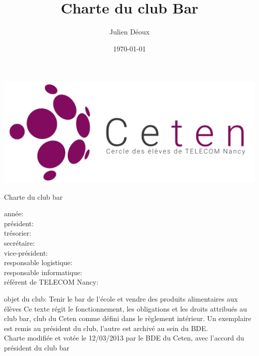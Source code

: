 \documentclass{article} %
\title{Charte du club Bar}
\author{Julien Déoux}
\date\today
\begin{document}
	

	\begin{titlepage}
		\begin{center}
			\includegraphics[width=\textwidth]{images/ceten}\par
			\vspace{2cm}
			{\Huge \light{} Charte du club bar}\par
			\vfill
			\begin{spacing}{1.5}
				année: \underline{\hspace{2cm}}\\
				président: \underline{\hspace{8cm}}\\
				trésorier: \underline{\hspace{8cm}}\\
				secrétaire: \underline{\hspace{8cm}}\\
				vice-président: \underline{\hspace{8cm}}\\
				responsable logistique: \underline{\hspace{8cm}}\\
				responsable informatique: \underline{\hspace{8cm}}\\
				référent de TELECOM Nancy: \underline{\hspace{8cm}}\\
			\end{spacing}
			\vspace{\baselineskip}
			objet du club: Tenir le bar de l'école et vendre des produits
			alimentaires aux élèves
			\vfill
			{\footnotesize \light{} Ce texte régit le fonctionnement, les
			obligations et les droits attribués au club bar, club du Ceten comme
			défini dans le règlement intérieur. Un exemplaire est remis au
			président du club, l’autre est archivé au sein du BDE\@. \\
			Charte modifiée et votée le 12/03/2013 par le BDE du Ceten, avec
			l'accord du président du club bar}
		\end{center}
	\end{titlepage}
\end{document}

